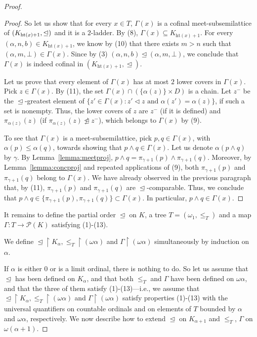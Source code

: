 \documentclass[]{amsart}
\theoremstyle{definition}
\theoremstyle{remark}
\begin{document}
\begin{proof}
\begin{proof}
So let us show that for every $x \in T$, $\Gamma(x)$ is a cofinal meet-subsemilattice of $(K_{\mathrm{ht}(x)+1}, \trianglelefteq\nobreak)$ and it is a $2$-ladder.
By (8), $\Gamma(x) \subseteq K_{\mathrm{ht}(x)+1}$. For every $(\alpha, n, b) \in K_{\mathrm{ht}(x)+1}$, we know by (10) that there exists $m > n$ such that $(\alpha, m, \bot) \in \Gamma(x)$. Since by (3) $(\alpha, n, b) \trianglelefteq (\alpha, m, \bot)$, we conclude that $\Gamma(x)$ is indeed cofinal in $(K_{\mathrm{ht}(x)+1}, \trianglelefteq)$.


Let us prove that every element of $\Gamma(x)$ has at most $2$ lower covers in $\Gamma(x)$. Pick $z \in \Gamma(x)$. By (11), the set $\Gamma (x) \cap (\{\alpha(z)\} \times D)$ is a chain. Let $z^-$ be the $\trianglelefteq$-greatest element of $\{z' \in \Gamma (x) : z' \lhd z \text{ and } \alpha(z') = \alpha(z)\}$, if such a set is nonempty. Thus, the lower covers of $z$ are $z^-$ (if it is defined) and $\pi_{\alpha(z)}(z)$ (if $\pi_{\alpha(z)}(z) \ntrianglelefteq z^-$), which belongs to $\Gamma (x)$ by (9).

To see that $\Gamma (x)$ is a meet-subsemilattice, pick $p, q \in \Gamma (x)$, with $\alpha(p) \le \alpha(q)$, towards showing that $p \wedge q \in \Gamma (x)$. Let us denote $\alpha(p \wedge q)$ by $\gamma$. By Lemma~\ref{lemma:meetproj}, $p \wedge q = \pi_{\gamma+1}(p) \wedge \pi_{\gamma+1}(q)$. Moreover, by Lemma~\ref{lemma:concproj} and repeated applications of (9), both $\pi_{\gamma+1}(p)$ and $\pi_{\gamma+1}(q)$ belong to $\Gamma (x)$. We have already observed in the previous paragraph that, by (11),  $\pi_{\gamma+1}(p)$ and $\pi_{\gamma+1}(q)$ are $\trianglelefteq$-comparable. Thus, we conclude that $p \wedge q \in \{\pi_{\gamma+1}(p),\pi_{\gamma+1}(q)\} \subset \Gamma(x)$. In particular, $p \wedge q \in \Gamma(x)$.
\end{proof}


It remains to define the partial order $\trianglelefteq$ on $K$, a tree $T = (\omega_1, \le_T)$ and a map $\Gamma : T \rightarrow \mathcal{P}(K)$ satisfying (1)-(13).

We define ${\trianglelefteq} \upharpoonright K_{\alpha}, {\le_T} \upharpoonright (\omega\alpha)$ and $\Gamma \upharpoonright (\omega\alpha)$ simultaneously by induction on $\alpha$. 

If $\alpha$ is either $0$ or is a limit ordinal, there is nothing to do. So let us assume that $\trianglelefteq$ has been defined on $K_\alpha$, and that both $\le_T$ and $\Gamma$ have been defined on $\omega \alpha$, and that the three of them satisfy (1)-(13)---i.e., we assume that ${\trianglelefteq} \upharpoonright K_\alpha, {\le_T} \upharpoonright (\omega\alpha)$ and $\Gamma \upharpoonright (\omega\alpha)$ satisfy properties (1)-(13) with the universal quantifiers on countable ordinals and on elements of $T$ bounded by $\alpha$ and $\omega\alpha$, respectively. We now describe how to extend $\trianglelefteq$ on $K_{\alpha+1}$ and $\le_T$, $\Gamma$ on $\omega(\alpha+1)$.


\end{proof}
\end{document}

